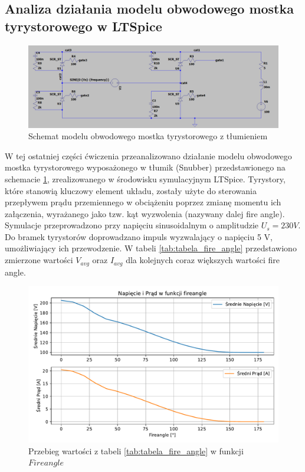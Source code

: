 \documentclass[11pt]{article}
\begin{document}
\subsection{Analiza działania modelu obwodowego mostka tyrystorowego w LTSpice}
\begin{figure}[H]
    \centering
    \includegraphics[width=0.85\linewidth]{aun1_fbps-schemat.png}
    \caption{Schemat modelu obwodowego mostka tyrystorowego z tłumieniem}
    \label{fig:fbps-schemat}
\end{figure}
W tej ostatniej części ćwiczenia przeanalizowano działanie modelu obwodowego mostka tyrystorowego wyposażonego w tłumik (Snubber) przedstawionego na schemacie \ref{fig:fbps-schemat}, zrealizowanego w środowisku symulacyjnym LTSpice. Tyrystory, które stanowią kluczowy element układu, zostały użyte do sterowania przepływem prądu przemiennego w obciążeniu poprzez zmianę momentu ich załączenia, wyrażanego jako tzw. kąt wyzwolenia (nazywany dalej fire angle).
Symulacje przeprowadzono przy napięciu sinusoidalnym o amplitudzie \(U_s=230 V\). Do bramek tyrystorów doprowadzano impuls wyzwalający o napięciu 5 V, umożliwiający ich przewodzenie. W tabeli \ref{tab:tabela_fire_angle} przedstawiono zmierzone wartości \(V_{avg}\) oraz \(I_{avg}\) dla kolejnych coraz większych wartości fire angle.
\begin{figure}[H]
    \centering
    \includegraphics[width=0.7\linewidth]{aun1_tyrystor_fireangle.pdf}
    \caption{Przebieg wartości z tabeli \ref{tab:tabela_fire_angle} w funkcji $Fire angle$}
    \label{fig:wykresIavgVavg}
\end{figure}
\end{document}
